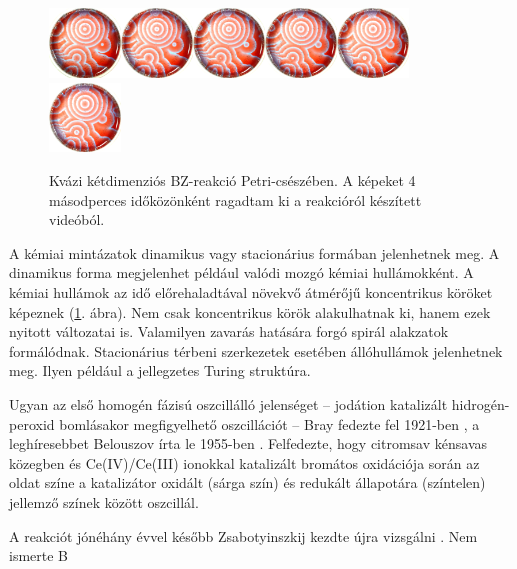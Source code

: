 \begin{figure}
\def\s{0.17}
\centering
\includegraphics[width=\s\textwidth]{img/sequence/0001.png}\includegraphics[width=\s\textwidth]{img/sequence/0111.png}\includegraphics[width=\s\textwidth]{img/sequence/0221.png}\includegraphics[width=\s\textwidth]{img/sequence/0331.png}\includegraphics[width=\s\textwidth]{img/sequence/0441.png}\includegraphics[width=\s\textwidth]{img/sequence/0551.png}
\caption{Kvázi kétdimenziós BZ-reakció Petri-csészében. A képeket 4 másodperces időközönként ragadtam ki a reakcióról készített videóból.}
\label{fig:bzsequence}
\end{figure}

A kémiai mintázatok dinamikus vagy stacionárius formában jelenhetnek meg. A dinamikus forma megjelenhet például valódi mozgó kémiai hullámokként. A kémiai hullámok az idő előrehaladtával növekvő átmérőjű koncentrikus köröket képeznek (\ref{fig:bzsequence}. ábra). Nem csak koncentrikus körök alakulhatnak ki, hanem ezek nyitott változatai is. Valamilyen zavarás hatására forgó spirál alakzatok formálódnak. Stacionárius térbeni szerkezetek esetében állóhullámok jelenhetnek meg. Ilyen például a jellegzetes Turing struktúra.

Ugyan az első homogén fázisú oszcillálló jelenséget -- jodátion katalizált hidrogén-peroxid bomlásakor megfigyelhető oszcillációt -- Bray fedezte fel 1921-ben \cite{bray1921periodic}, a leghíresebbet Belouszov írta le 1955-ben \cite{belousov1959collection}. Felfedezte, hogy citromsav kénsavas közegben és Ce(IV)/Ce(III) ionokkal katalizált bromátos oxidációja során az oldat színe a katalizátor oxidált (sárga szín) és redukált állapotára (színtelen) jellemző színek között oszcillál.

A reakciót jónéhány évvel később Zsabotyinszkij kezdte újra vizsgálni \cite{zhabotinsky1964periodical}. Nem ismerte B